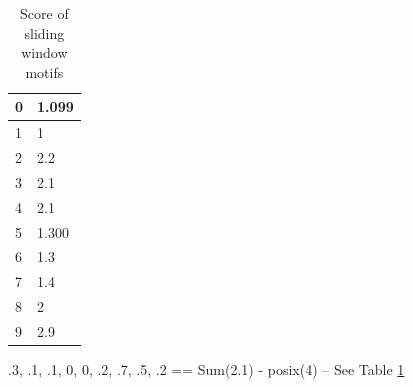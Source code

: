 
\begin{table}
    \centering
    \caption{Score of sliding window motifs} \label{wrapTable:pssm-score}
    \begin{tabular}{|l|l|}
    \hline
    
    0 & 1.099 \\ \hline
    1 & 1 \\ \hline
    2 & 2.2 \\ \hline
    3 & 2.1 \\ \hline
    4 & 2.1 \\ \hline
    5 & 1.300 \\ \hline
    6 & 1.3 \\ \hline
    7 & 1.4 \\ \hline
    8 & 2 \\ \hline
    9 & 2.9 \\ \hline
    
    \end{tabular}
\end{table}

.3, .1, .1, 0, 0, .2, .7, .5, .2  == Sum(2.1) - posix(4) -- See Table \ref{wrapTable:pssm-score}

